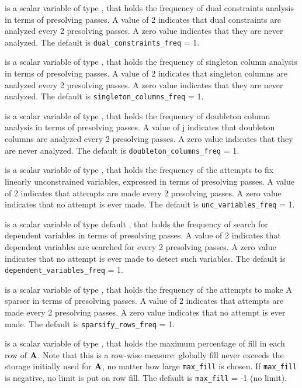 \documentclass{galahad}
\begin{document}
\begin{description}
 is a scalar variable of type \integer,
that holds the frequency of dual constraints analysis in terms of
presolving passes.  A value of 2 indicates that dual
constraints are analyzed every 2 presolving passes.  A zero
value indicates that they are never analyzed.
The default is {\tt dual\_constraints\_freq} = 1.

 is a scalar variable of type \integer,
that holds the frequency of singleton column analysis in terms of
presolving passes.  A value of 2 indicates that
singleton columns are analyzed every 2 presolving passes.
A zero value indicates that they are never analyzed.
The default is {\tt singleton\_columns\_freq} = 1.

 is a scalar variable of type \integer,
that holds the frequency of doubleton column analysis in terms of
presolving passes.  A value of j indicates that doubleton
columns are analyzed every 2 presolving passes.  A zero
value indicates that they are never analyzed.
The default is {\tt doubleton\_columns\_freq} = 1.

 is a scalar variable of type \integer,
that holds the frequency of the attempts to fix linearly unconstrained
variables, expressed in terms of presolving passes.  A
value of 2 indicates that attempts are made every 2
presolving passes.  A zero value indicates that no attempt is ever made.
The default is {\tt unc\_variables\_freq} = 1.

 is a scalar variable of type default
\integer, that holds the frequency of search for dependent variables in terms
of  presolving passes.  A value of 2 indicates that
dependent variables are searched for every 2 presolving
passes.  A zero value indicates that no attempt is ever made to detect such
variables. The default is {\tt dependent\_variables\_freq} = 1.

 is a scalar variable of type \integer,
that holds the frequency of the attempts to make A sparser in terms of
presolving passes.  A value of 2 indicates that attempts
are made every 2 presolving passes.  A zero value indicates
that no attempt is ever made.
The default is {\tt sparsify\_rows\_freq} = 1.

 is a scalar variable of type \integer, that holds
the maximum percentage of fill in each row of ${\mathbf{A}}$. Note that
this is a row-wise measure: globally fill never exceeds
the storage initially used for ${\mathbf{A}}$, no matter how large
{\tt max\_fill} is chosen. If {\tt max\_fill} is negative,
no limit is put on row fill.
The default is {\tt max\_fill} = -1 (no limit).


\end{description}
\end{document}

